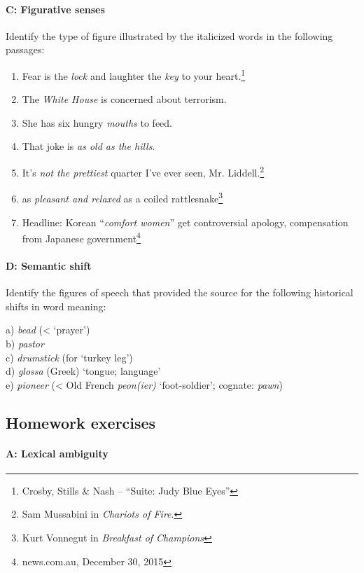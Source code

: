 \paragraph*{C: Figurative senses}

Identify the type of figure illustrated by the italicized words in the following passages:

\begin{enumerate}
\item Fear is the \textit{lock} and laughter the \textit{key} to your heart.\footnote{Crosby, Stills \& Nash – “Suite: Judy Blue Eyes”}
\item The \textit{White House} is concerned about terrorism.
\item She has six hungry \textit{mouths} to feed.
\item That joke is \textit{as old as the hills}.
\item It’s \textit{not the prettiest} quarter I’ve ever seen, Mr. Liddell.\footnote{Sam Mussabini in \textit{Chariots of Fire}.}
\item as \textit{pleasant and relaxed} as a coiled rattlesnake\footnote{Kurt Vonnegut in \textit{Breakfast of Champions}}
\item Headline: Korean “\textit{comfort women}” get controversial apology, compensation from Japanese government\footnote{news.com.au, December 30, 2015}
\end{enumerate}
\paragraph*{D: Semantic shift}

Identify the figures of speech that provided the source for the following historical shifts in word meaning:

\begin{stylepoints}
a) \textit{bead} (< ‘prayer’)\\
b) \textit{pastor}\\
c) \textit{drumstick} (for ‘turkey leg’)\\
d) \textit{glossa} (Greek) ‘tongue; language’\\
e) \textit{pioneer} (< Old French \textit{peon(ier)} ‘foot-soldier’; cognate: \textit{pawn})
\end{stylepoints}

\subsection*{Homework exercises}
\paragraph*{A: Lexical ambiguity}

